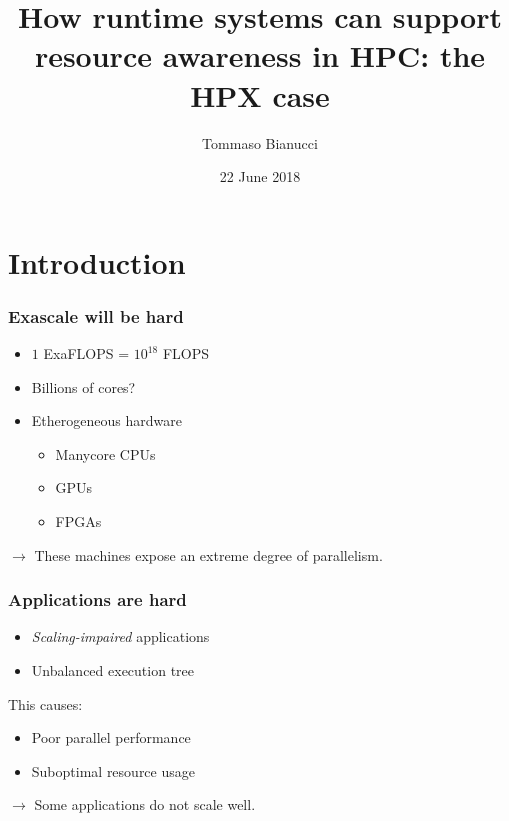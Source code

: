 \documentclass[compress]{beamer}
\title[]{How runtime systems can support resource awareness in HPC: the HPX case}
\author{Tommaso Bianucci}
\date{22 June 2018}
\institute{Technische Universität München}
\begin{document}
\begin{frame}
\maketitle
\end{frame}

\section{Introduction}
\begin{frame}
	\frametitle{Exascale will be hard}
	\begin{itemize}
		\item $1$ ExaFLOPS = $10^{18}$ FLOPS
		\item Billions of cores?
		\item Etherogeneous hardware
		\begin{itemize}
			\item Manycore CPUs
			\item GPUs
			\item FPGAs
		\end{itemize}
	\end{itemize}
	\pause
	\vspace{5mm}
	$\longrightarrow$ These machines expose an extreme degree of parallelism.
\end{frame}

\begin{frame}
	\frametitle{Applications are hard}
	\begin{itemize}
		\item \emph{Scaling-impaired} applications
		\item Unbalanced execution tree
	\end{itemize}
	\pause
	This causes:
	\begin{itemize}
		\item Poor parallel performance
		\item Suboptimal resource usage
	\end{itemize}
	\pause
	\vspace{5mm}
	$\longrightarrow$ Some applications do not scale well.
\end{frame}
\end{document}
